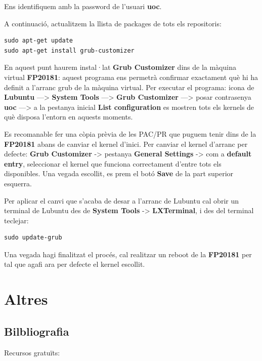 \documentclass[]{book}
\begin{document}
Ens identifiquem amb la password de l'usuari \textbf{uoc}.

A continuació, actualitzem la llista de packages de tots els
repositoris:

\begin{verbatim}
sudo apt-get update
sudo apt-get install grub-customizer
\end{verbatim}

En aquest punt haurem instal·lat \textbf{Grub Customizer} dins de la
màquina virtual \textbf{FP20181}: aquest programa ens permetrà confirmar
exactament què hi ha definit a l'arranc grub de la màquina virtual. Per
executar el programa: icona de \textbf{Lubuntu} ---\textgreater{}
\textbf{System Tools} ---\textgreater{} \textbf{Grub Customizer}
---\textgreater{} posar contrasenya \textbf{uoc} ---\textgreater{} a la
pestanya inicial \textbf{List configuration} es mostren tots els kernels
de què disposa l'entorn en aquests moments.

Es recomanable fer una còpia prèvia de les PAC/PR que puguem tenir dins
de la \textbf{FP20181} abans de canviar el kernel d'inici. Per canviar
el kernel d'arranc per defecte: \textbf{Grub Customizer} -\textgreater{}
pestanya \textbf{General Settings} -\textgreater{} com a \textbf{default
entry}, seleccionar el kernel que funciona correctament d'entre tots els
disponibles. Una vegada escollit, es prem el botó \textbf{Save} de la
part superior esquerra.

Per aplicar el canvi que s'acaba de desar a l'arranc de Lubuntu cal
obrir un terminal de Lubuntu des de \textbf{System Tools}
-\textgreater{} \textbf{LXTerminal}, i des del terminal teclejar:

\begin{verbatim}
sudo update-grub
\end{verbatim}

Una vegada hagi finalitzat el procés, cal realitzar un reboot de la
\textbf{FP20181} per tal que agafi ara per defecte el kernel escollit.

\chapter{Altres}\label{altres}

\section{Bilbliografia}\label{bilbliografia}

Recursos gratuïts:
\end{document}
